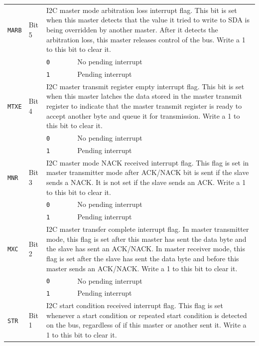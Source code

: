 \begin{tabularx}{\textwidth}{ l l l X }
\hline
\texttt{MARB} & Bit 5 & \multicolumn{2}{X}{I2C master mode arbitration loss interrupt flag. This bit is set when this master detects that the value it tried to write to SDA is being overridden by another master. After it detects the arbitration loss, this master releases control of the bus. Write a 1 to this bit to clear it.} \\
 & & \texttt{0} & No pending interrupt \\
 & & \cellcolor{tablehighlightcolor}\texttt{1} & \cellcolor{tablehighlightcolor}Pending interrupt \\
\hline
\texttt{MTXE} & Bit 4 & \multicolumn{2}{X}{I2C master transmit register empty interrupt flag. This bit is set when this master latches the data stored in the master transmit register to indicate that the master transmit register is ready to accept another byte and queue it for transmission. Write a 1 to this bit to clear it.} \\
 & & \texttt{0} & No pending interrupt \\
 & & \cellcolor{tablehighlightcolor}\texttt{1} & \cellcolor{tablehighlightcolor}Pending interrupt \\
\hline
\texttt{MNR} & Bit 3 & \multicolumn{2}{X}{I2C master mode NACK received interrupt flag. This flag is set in master transmitter mode after ACK/NACK bit is sent if the slave sends a NACK. It is not set if the slave sends an ACK. Write a 1 to this bit to clear it.} \\
 & & \texttt{0} & No pending interrupt \\
 & & \cellcolor{tablehighlightcolor}\texttt{1} & \cellcolor{tablehighlightcolor}Pending interrupt \\
\hline
\texttt{MXC} & Bit 2 & \multicolumn{2}{X}{I2C master transfer complete interrupt flag. In master transmitter mode, this flag is set after this master has sent the data byte and the slave has sent an ACK/NACK. In master receiver mode, this flag is set after the slave has sent the data byte and before this master sends an ACK/NACK. Write a 1 to this bit to clear it.} \\
 & & \texttt{0} & No pending interrupt \\
 & & \cellcolor{tablehighlightcolor}\texttt{1} & \cellcolor{tablehighlightcolor}Pending interrupt \\
\hline
\texttt{STR} & Bit 1 & \multicolumn{2}{X}{I2C start condition received interrupt flag. This flag is set whenever a start condition or repeated start condition is detected on the bus, regardless of if this master or another sent it. Write a 1 to this bit to clear it.} \\

\end{tabularx}
